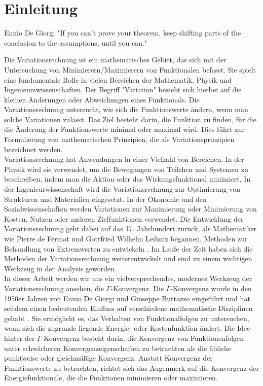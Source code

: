 \chapter{Einleitung}
\begin{chapquote}{Ennio De Giorgi}
"If you can't prove your theorem, keep shifting parts of the conclusion to the assumptions, until you can."
\end{chapquote}
Die Variationsrechnung ist ein mathematisches Gebiet, das sich mit der Untersuchung von Minimierern/Maximierern von Funktionalen befasst. Sie spielt eine fundamentale Rolle in vielen Bereichen der Mathematik, Physik und Ingenieurswissenschaften. Der Begriff "Variation" bezieht sich hierbei auf die kleinen Änderungen oder Abweichungen eines Funktionals. Die Variationsrechnung untersucht, wie sich die Funktionswerte ändern, wenn man solche Variationen zulässt. Das Ziel besteht darin, die Funktion zu finden, für die die Änderung der Funktionswerte minimal oder maximal wird. Dies führt zur Formulierung von mathematischen Prinzipien, die als Variationsprinzipien bezeichnet werden.\\
Variationsrechnung hat Anwendungen in einer Vielzahl von Bereichen. In der Physik wird sie verwendet, um die Bewegungen von Teilchen und Systemen zu beschreiben, indem man die Aktion oder das Wirkungsfunktional minimiert. In der Ingenieurwissenschaft wird die Variationsrechnung zur Optimierung von Strukturen und Materialien eingesetzt. In der Ökonomie und den Sozialwissenschaften werden Variationen zur Maximierung oder Minimierung von Kosten, Nutzen oder anderen Zielfunktionen verwendet. Die Entwicklung der Variationsrechnung geht dabei auf das 17. Jahrhundert zurück, als Mathematiker wie Pierre de Fermat und Gottfried Wilhelm Leibniz begannen, Methoden zur Behandlung von Extremwerten zu entwickeln \cite{Goldstine1980}. Im Laufe der Zeit haben sich die Methoden der Variationsrechnung weiterentwickelt und sind zu einem wichtigen Werkzeug in der Analysis geworden.\\

In dieser Arbeit werden wir uns ein vielversprechendes, modernes Werkzeug der Variationsrechnung ansehen, die \(\Gamma\)-Konvergenz. Die \(\Gamma\)-Konvergenz wurde in den 1950er Jahren von Ennio De Giorgi und Giuseppe Buttazzo eingeführt und hat seitdem einen bedeutenden Einfluss auf verschiedene mathematische Disziplinen gehabt \cite{BioDeGiorgi}. Sie ermöglicht es, das Verhalten von Funktionalfolgen zu untersuchen, wenn sich die zugrunde liegende Energie- oder Kostenfunktion ändert. Die Idee hinter der \(\Gamma\)-Konvergenz besteht darin, die Konvergenz von Funktionenfolgen unter schwächeren Konvergenzeigenschaften zu betrachten als die übliche punktweise oder gleichmäßige Konvergenz. Anstatt Konvergenz der Funktionswerte zu betrachten, richtet sich das Augenmerk auf die Konvergenz der Energiefunktionale, die die Funktionen minimieren oder maximieren.